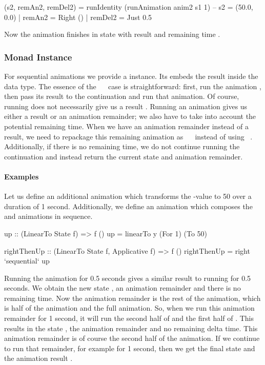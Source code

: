 \begin{code}
(s2, remAn2, remDel2) = runIdentity (runAnimation anim2 s1 1)
-- s2 = (50.0, 0.0) | remAn2 = Right () | remDel2 = Just 0.5
\end{code}

Now the animation finishes in state  with result \hs{()} and remaining time .

\subsubsection{Monad Instance}

For sequential animations we provide a  instance. Its  embeds the
result  inside the  data type. The essence of the
~\hs{>>=}~ case is straightforward: first, run the animation
, then pass its result to the continuation  and run that animation.
Of course, running  does not necessarily give us a result . Running
an animation gives us either a result or an animation remainder; we also have
to take into account the potential remaining time. When we have an
animation remainder instead of a result, we need to repackage this remaining
animation as ~\hs{>>=}~ instead of using ~.
Additionally, if there is no remaining time,  we do not continue
running the continuation and instead return the current state and animation
remainder.

\paragraph{Examples}

Let us define an additional animation  which transforms the -value to 50 over a duration of 1 second. Additionally, we define an animation  which composes the  and  animations in sequence.

\begin{code}
up :: (LinearTo State f) => f ()
up = linearTo y (For 1) (To 50)

rightThenUp :: (LinearTo State f, Applicative f) => f ()
rightThenUp = right `sequential` up
\end{code}

Running the  animation for 0.5 seconds gives a similar result
to running  for 0.5 seconds. We obtain the new state , an animation remainder  and there is no remaining time.
Now the animation remainder is the rest of the  animation,
which is half of the  animation and the full  animation. So,
when we run this animation remainder for 1 second, it will run the second half
of  and the first half of .  This results in the state
, the animation remainder  and no remaining delta time.
This animation remainder is of course the second half of the  animation.
If we continue to run that remainder, for example for 1 second, then we get the
final state  and the animation result \hs{()}.

